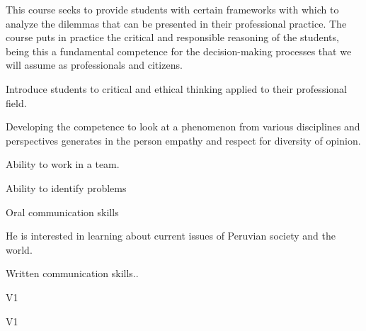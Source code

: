 \begin{syllabus}


\begin{justification}
This course seeks to provide students with certain frameworks with which to analyze the dilemmas that can be presented in their professional practice. The course puts in practice the critical and responsible reasoning of the students, being this a fundamental competence for the decision-making processes that we will assume as professionals and citizens.
\end{justification}

\begin{goals}
\item Introduce students to critical and ethical thinking applied to their professional field.
\item Developing the competence to look at a phenomenon from various disciplines and perspectives generates in the person empathy and respect for diversity of opinion.
\item Ability to work in a team.
\item Ability to identify problems
\item Oral communication skills
\item He is interested in learning about current issues of Peruvian society and the world.
\item Written communication skills..
\end{goals}

\begin{outcomes}{V1}
    \item {}
    \item {}
    \item {}
    \item {}
    \item {}
\end{outcomes}

\begin{competences}{V1}
    \item {}
    \item {}
    \item {}
    \item {}
\end{competences}


\end{syllabus}
